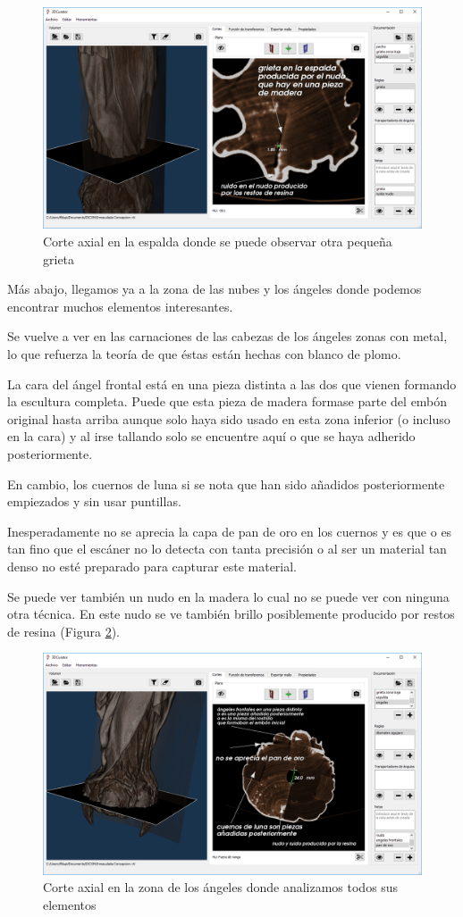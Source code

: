 \begin{figure}[H]
	\centering
	\includegraphics[width=12.5cm]{imagenes/resultados/documentacion/inmaculada-concepcion/espalda}
	\caption{Corte axial en la espalda donde se puede observar otra pequeña grieta}
	\label{fig:resultados/documentacion/inmaculada-concepcion/espalda}
\end{figure}

Más abajo, llegamos ya a la zona de las nubes y los ángeles donde podemos encontrar muchos elementos interesantes.

Se vuelve a ver en las carnaciones de las cabezas de los ángeles zonas con metal, lo que refuerza la teoría de que éstas están hechas con blanco de plomo.

La cara del ángel frontal está en una pieza distinta a las dos que vienen formando la escultura completa. Puede que esta pieza de madera formase parte del embón original hasta arriba aunque solo haya sido usado en esta zona inferior (o incluso en la cara) y al irse tallando solo se encuentre aquí o que se haya adherido posteriormente.

En cambio, los cuernos de luna si se nota que han sido añadidos posteriormente empiezados y sin usar puntillas.

Inesperadamente no se aprecia la capa de pan de oro en los cuernos y es que o es tan fino que el escáner no lo detecta con tanta precisión o al ser un material tan denso no esté preparado para capturar este material.

Se puede ver también un nudo en la madera lo cual no se puede ver con ninguna otra técnica. En este nudo se ve también brillo posiblemente producido por restos de resina (Figura \ref{fig:resultados/documentacion/inmaculada-concepcion/angeles}). 

\begin{figure}[H]
	\centering
	\includegraphics[width=12.5cm]{imagenes/resultados/documentacion/inmaculada-concepcion/angeles}
	\caption{Corte axial en la zona de los ángeles donde analizamos todos sus elementos}
	\label{fig:resultados/documentacion/inmaculada-concepcion/angeles}
\end{figure}


